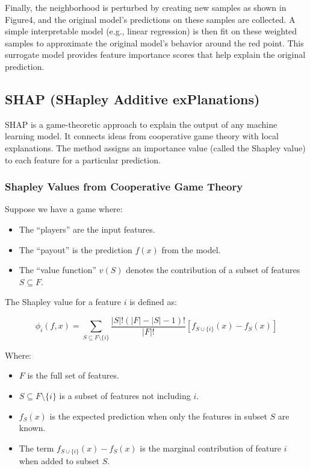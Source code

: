 \documentclass[conference,letterpaper]{IEEEtran}
\begin{document}
Finally, the neighborhood is perturbed by creating new samples as shown in Figure4, and the original model's predictions on these samples are collected. A simple interpretable model (e.g., linear regression) is then fit on these weighted samples to approximate the original model's behavior around the red point. This surrogate model provides feature importance scores that help explain the original prediction.

\subsection*{SHAP (SHapley Additive exPlanations)}

SHAP is a game-theoretic approach to explain the output of any machine learning model. It connects ideas from cooperative game theory with local explanations. The method assigns an importance value (called the Shapley value) to each feature for a particular prediction.

\subsubsection*{Shapley Values from Cooperative Game Theory}

Suppose we have a game where:
\begin{itemize}
    \item The ``players'' are the input features.
    \item The ``payout'' is the prediction \( f(x) \) from the model.
    \item The ``value function'' \( v(S) \) denotes the contribution of a subset of features \( S \subseteq F \).
\end{itemize}

The Shapley value for a feature \( i \) is defined as:

\[
\phi_i(f, x) = \sum_{S \subseteq F \setminus \{i\}} \frac{|S|!(|F| - |S| - 1)!}{|F|!} \left[ f_{S \cup \{i\}}(x) - f_S(x) \right]
\]

Where:
\begin{itemize}
    \item \( F \) is the full set of features.
    \item \( S \subseteq F \setminus \{i\} \) is a subset of features not including \( i \).
    \item \( f_S(x) \) is the expected prediction when only the features in subset \( S \) are known.
    \item The term \( f_{S \cup \{i\}}(x) - f_S(x) \) is the marginal contribution of feature \( i \) when added to subset \( S \).
\end{itemize}
\end{document}

